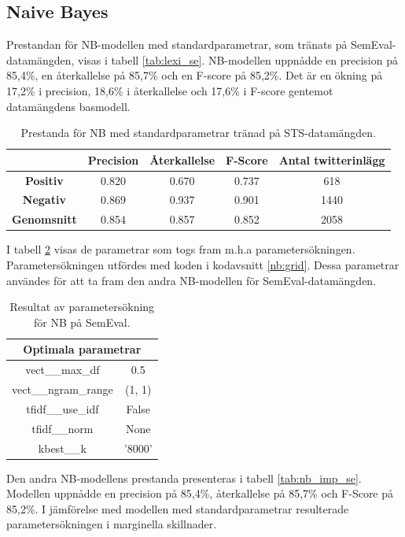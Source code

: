 \documentclass{kaumasters} %
\begin{document}
\subsection{Naive Bayes}
Prestandan för NB-modellen med standardparametrar, som tränats på SemEval-datamängden, visas i tabell \ref{tab:lexi_se}. NB-modellen uppnådde en precision på 85,4\%, en återkallelse på 85,7\% och en F-score på 85,2\%. Det är en ökning på 17,2\% i precision, 18,6\% i återkallelse och 17,6\% i F-score gentemot datamängdens basmodell.

\begin{table}[H]
\centering
\caption{Prestanda för NB med standardparametrar tränad på STS-datamängden.}
\label{tab:nb_base_se}
    \begin{tabular}{ccccc}
    \toprule
     & \textbf{Precision} & \textbf{Återkallelse} & \textbf{F-Score} & \textbf{Antal twitterinlägg}  \\
    \midrule
    \textbf{Positiv} & 0.820 & 0.670 & 0.737 & 618 \\
    \textbf{Negativ} & 0.869 & 0.937 & 0.901 & 1440 \\
    \midrule
    \textbf{Genomsnitt} & 0.854 & 0.857 & 0.852  & 2058 \\
    \bottomrule
\end{tabular}
\end{table}

I tabell \ref{tab:nb_grid_se} visas de parametrar som togs fram m.h.a parametersökningen. Parametersökningen utfördes med koden i kodavsnitt \ref{nb:grid}. Dessa parametrar användes för att ta fram den andra NB-modellen för SemEval-datamängden.

\begin{table}[H]
\centering
\caption{Resultat av parametersökning för NB på SemEval.}
\label{tab:nb_grid_se}
    \begin{tabular}{cc}
    \toprule
    \multicolumn{2}{c}{\textbf{Optimala parametrar}} \\
    \midrule
    vect\_\_max\_df & 0.5  \\
    vect\_\_ngram\_range & (1, 1)  \\
    tfidf\_\_use\_idf & False  \\
    tfidf\_\_norm & None  \\
    kbest\_\_k & '8000' \\
    \bottomrule
\end{tabular}
\end{table}

Den andra NB-modellens prestanda presenteras i tabell \ref{tab:nb_imp_se}. Modellen uppnådde en precision på 85,4\%, återkallelse på 85,7\% och F-Score på 85,2\%. I jämförelse med modellen med standardparametrar resulterade parametersökningen i marginella skillnader.  
\end{document}
